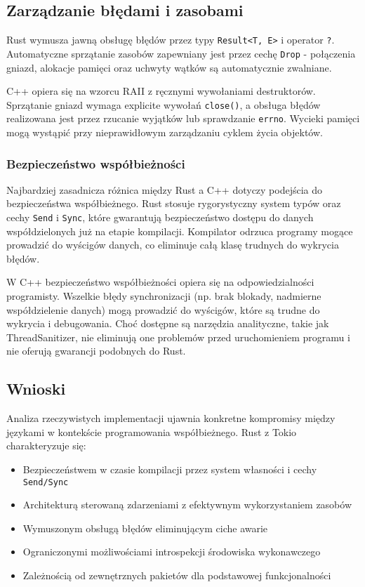 \subsection{Zarządzanie błędami i zasobami}

Rust wymusza jawną obsługę błędów przez typy \texttt{Result<T, E>} i operator \texttt{?}. Automatyczne sprzątanie zasobów zapewniany jest przez cechę \texttt{Drop} - połączenia gniazd, alokacje pamięci oraz uchwyty wątków są automatycznie zwalniane.

C++ opiera się na wzorcu RAII z ręcznymi wywołaniami destruktorów. Sprzątanie gniazd wymaga explicite wywołań \texttt{close()}, a obsługa błędów realizowana jest przez rzucanie wyjątków lub sprawdzanie \texttt{errno}. Wycieki pamięci mogą wystąpić przy nieprawidłowym zarządzaniu cyklem życia objektów.


\subsubsection{Bezpieczeństwo współbieżności}

Najbardziej zasadnicza różnica między Rust a C++ dotyczy podejścia do bezpieczeństwa współbieżnego. Rust stosuje rygorystyczny system typów oraz cechy \texttt{Send} i \texttt{Sync}, które gwarantują bezpieczeństwo dostępu do danych współdzielonych już na etapie kompilacji. Kompilator odrzuca programy mogące prowadzić do wyścigów danych, co eliminuje całą klasę trudnych do wykrycia błędów.

W C++ bezpieczeństwo współbieżności opiera się na odpowiedzialności programisty. Wszelkie błędy synchronizacji (np. brak blokady, nadmierne współdzielenie danych) mogą prowadzić do wyścigów, które są trudne do wykrycia i debugowania. Choć dostępne są narzędzia analityczne, takie jak ThreadSanitizer, nie eliminują one problemów przed uruchomieniem programu i nie oferują gwarancji podobnych do Rust.



\subsection{Wnioski}

Analiza rzeczywistych implementacji ujawnia konkretne kompromisy między językami w kontekście programowania współbieżnego.
Rust z Tokio charakteryzuje się:
\begin{itemize}
    \item Bezpieczeństwem w czasie kompilacji przez system własności i cechy \texttt{Send/Sync}
    \item Architekturą sterowaną zdarzeniami z efektywnym wykorzystaniem zasobów
    \item Wymuszonym obsługą błędów eliminującym ciche awarie 
    \item Ograniczonymi możliwościami introspekcji środowiska wykonawczego
    \item Zależnością od zewnętrznych pakietów  dla podstawowej funkcjonalności
\end{itemize}

